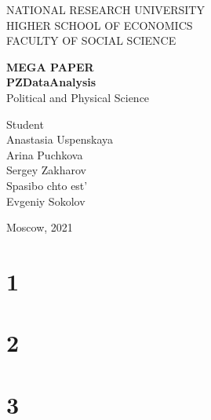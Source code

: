 \documentclass[14pt]{extarticle}
\begin{document}
	
	
	\thispagestyle{empty} 
	
	\begin{center}
		NATIONAL RESEARCH UNIVERSITY
		\\
		HIGHER SCHOOL OF ECONOMICS
		\\
		FACULTY OF SOCIAL SCIENCE
		
	\end{center}
	\vspace{12ex}
	
	\begin{center}
		\textbf{MEGA PAPER}\\
		\vspace{2ex}
		\textbf{PZDataAnalysis}\\
		\vspace{2ex}
		Political and Physical Science
	\end{center}
	
	\vspace{5ex}
	\begin{flushright}
		\hspace{40ex}
		Student\\
		Anastasia Uspenskaya \\
		Arina Puchkova \\
		Sergey Zakharov\\
		
		\vspace{5ex}
		Spasibo chto est'\\
		Evgeniy Sokolov \\
		
		
		
	\end{flushright}
	
	\begin{center}
		\vfill
		Moscow, 2021
	\end{center}
	
	\newpage
	
	
	\tableofcontents
	
	
	\section{1}
	
	
	\section{2}
	
	
	
	\section{3} %
	
	
\end{document}
